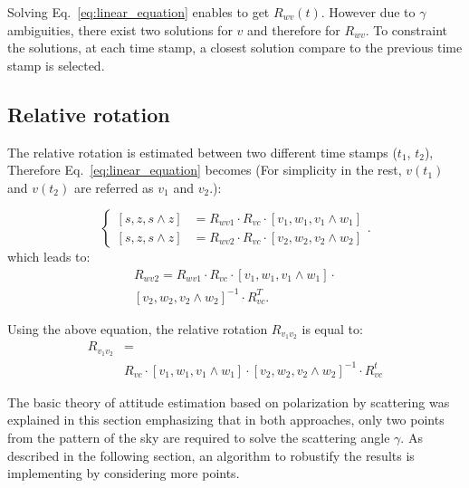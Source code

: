 Solving Eq.~\ref{eq:linear_equation} enables to get $R_{wv}(t)$. However due to
$\gamma$ ambiguities, there exist two solutions for $v$ and therefore for
$R_{wv}$.
To constraint the solutions, at each time stamp, a closest solution compare to
the previous time stamp is selected.



\subsection{Relative rotation}
\label{sec:rel-rot}

The relative rotation is estimated between two different time stamps ($t_1$,
$t_2$), Therefore Eq.~\ref{eq:linear_equation} becomes (For simplicity in the
rest, $v(t_1)$ and $v(t_2)$ are referred as $v_1$ and $v_2$.):

\begin{equation}
\begin{cases}
\left[s,z,s\wedge z\right] & =R_{wv1}\cdot R_{vc}\cdot\left[v_{1},w_{1},v_{1}\wedge w_{1}\right]\\
\left[s,z,s\wedge z\right] & =R_{wv2}\cdot R_{vc}\cdot\left[v_{2},w_{2},v_{2}\wedge w_{2}\right]
\end{cases}.
\label{eq:rel-linear_equation}
\end{equation}
\noindent which leads to:
\begin{equation}
  \begin{split}
R_{wv2}=R_{wv1}\cdot R_{vc}\cdot\left[v_{1},w_{1},v_{1}\wedge
  w_{1}\right]\cdot \\
\left[v_{2},w_{2},v_{2}\wedge w_{2}\right]^{-1} \cdot R_{vc}^{T}.
\label{eq:relative_equation}\end{split}
\end{equation}

Using the above equation, the relative rotation $R_{v_{1}v_{2}}$ is equal to:
\begin{equation}
\begin{split}
  R_{v_{1}v_{2}} &= \\
   & R_{vc}\cdot\left[v_{1},w_{1},v_{1}\wedge
  w_{1}\right]\cdot\left[v_{2},w_{2},v_{2}\wedge w_{2}\right]^{-1}\cdot
R_{vc}^{t}
\end{split}
\label{eq:final-relative}
\end{equation}


The basic theory of attitude estimation based on polarization by scattering was explained in this
section emphasizing that in both approaches, only two points from the pattern of the sky are required
to solve the scattering angle $\gamma$. As described in the following section, an algorithm to robustify 
the results is implementing by considering more points.





